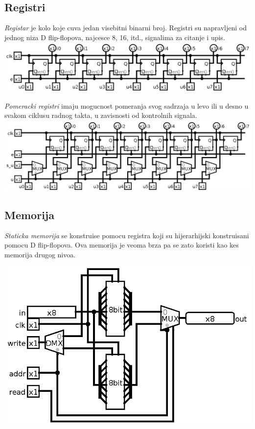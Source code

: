 \documentclass[12p,a4paper]{article}
\begin{document}
\begin{multicols}{2}
    \subsection{Registri}

    \emph{Registar} je kolo koje cuva jedan visebitni binarni broj. Registri
    su napravljeni od jednog niza D flip-flopova, najcesce 8, 16, itd., 
    signalima za citanje i upis.
    \includegraphics[width=\columnwidth]{Figures/reg_8bit.png}

    \emph{Pomeracki registri} imaju mogucnost pomeranja svog sadrzaja u levo
    ili u desno u svakom ciklusu radnog takta, u zavisnosti od kontrolnih
    signala.
    \includegraphics[width=\columnwidth]{Figures/shift_reg.png}

    \subsection{Memorija}
    
    \emph{Staticka memorija} se konstruise pomocu registra koji su 
    hijerarhijski konstruisani pomocu D flip-flopova. Ova memorija je veoma
    brza pa se zato koristi kao kes memorija drugog nivoa.

    \includegraphics[width=\columnwidth]{Figures/mem28.png}


\end{multicols}
\end{document}
